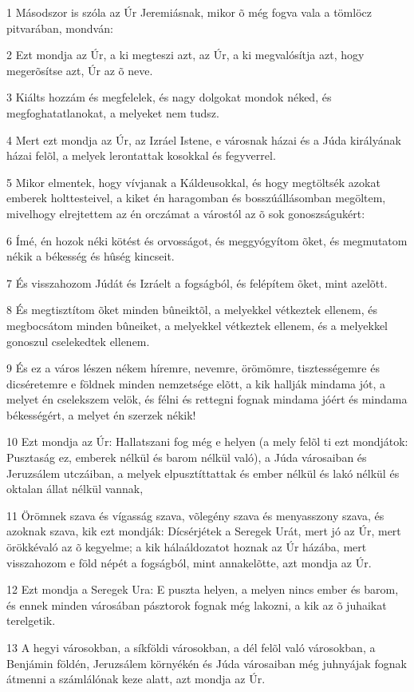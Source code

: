 \par 1 Másodszor is szóla az Úr Jeremiásnak, mikor õ még fogva vala a tömlöcz pitvarában, mondván:
\par 2 Ezt mondja az Úr, a ki megteszi azt, az Úr, a ki megvalósítja azt, hogy megerõsítse azt, Úr az õ neve.
\par 3 Kiálts hozzám és megfelelek, és nagy dolgokat mondok néked, és megfoghatatlanokat, a melyeket nem tudsz.
\par 4 Mert ezt mondja az Úr, az Izráel Istene, e városnak házai és a Júda királyának házai felõl, a melyek lerontattak kosokkal és fegyverrel.
\par 5 Mikor elmentek, hogy vívjanak a Káldeusokkal, és hogy megtöltsék azokat emberek holttesteivel, a kiket én haragomban és bosszúállásomban megöltem, mivelhogy elrejtettem az én orczámat a várostól az õ sok gonoszságukért:
\par 6 Ímé, én hozok néki kötést és orvosságot, és meggyógyítom õket, és megmutatom nékik a békesség és hûség kincseit.
\par 7 És visszahozom Júdát és Izráelt a fogságból, és felépítem õket, mint azelõtt.
\par 8 És megtisztítom õket minden bûneiktõl, a melyekkel vétkeztek ellenem, és megbocsátom  minden bûneiket, a melyekkel vétkeztek ellenem, és a melyekkel gonoszul cselekedtek ellenem.
\par 9 És ez a város lészen nékem híremre, nevemre, örömömre, tisztességemre és dicséretemre e földnek minden nemzetsége elõtt, a kik hallják mindama jót, a melyet én cselekszem velök, és félni és rettegni fognak mindama jóért és mindama békességért, a melyet én szerzek nékik!
\par 10 Ezt mondja az Úr: Hallatszani fog még e helyen (a mely felõl ti ezt mondjátok: Pusztaság ez, emberek nélkül és barom nélkül való), a Júda városaiban és Jeruzsálem utczáiban, a melyek elpusztíttattak és ember nélkül és lakó nélkül és oktalan állat nélkül vannak,
\par 11 Örömnek szava és vígasság szava, võlegény szava és menyasszony szava, és azoknak szava, kik ezt mondják: Dícsérjétek a Seregek Urát, mert jó az Úr, mert örökkévaló az õ kegyelme; a kik hálaáldozatot hoznak az Úr házába, mert visszahozom e föld népét a fogságból, mint annakelõtte, azt mondja az Úr.
\par 12 Ezt mondja a Seregek Ura: E puszta helyen, a melyen nincs ember és barom, és ennek minden városában pásztorok fognak még lakozni, a kik az õ juhaikat terelgetik.
\par 13 A hegyi városokban, a síkföldi városokban, a dél felõl való városokban, a Benjámin földén, Jeruzsálem környékén és Júda városaiban még juhnyájak fognak átmenni a számlálónak keze alatt, azt mondja az Úr.
